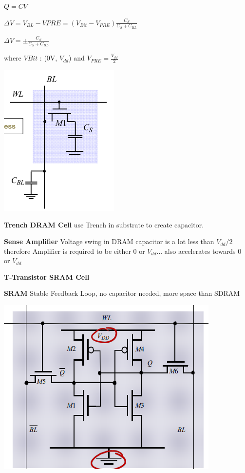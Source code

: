 \documentclass[english]{latex4ei/latex4ei_sheet}
\begin{document}
$Q = C V$

$\Delta V = V_{BL} - V{PRE} = (V_{Bit} - V_{PRE})\frac{C_S}{C_S + C_{BL}}$

$\Delta V = \pm \frac{C_S}{C_S + C_{BL}}$

where $V{Bit}$ : (0V, $V_{dd}$) and $V_{PRE} = \frac{V_{dd}}{2}$

\begin{center}
	\centering
	\includegraphics[width=0.4\linewidth]{images//5.Memory/DRAMCell.png}
\end{center}

\textbf{Trench DRAM Cell} use Trench in substrate to create capacitor.

\textbf{Sense Amplifier} Voltage swing in DRAM capacitor is a lot less than $V_{dd} / 2$ therefore Amplifier is required to be either 0 or $V_{dd}$... also accelerates towards 0 or $V_{dd}$

\textbf{T-Transistor SRAM Cell}

\textbf{SRAM} Stable Feedback Loop, no capacitor needed, more space than SDRAM

\begin{center}
  \centering
  \includegraphics[width=0.8\linewidth]{assets/SRAMCell.png}
  \label{fig:sramcell}
\end{center}
\end{document}
